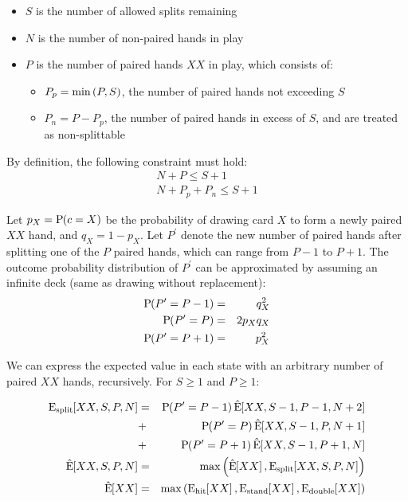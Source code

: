 \begin{itemize}
\item $S$ is the number of allowed splits remaining
\item $N$ is the number of non-paired hands in play
\item $P$ is the number of paired hands $XX$ in play, which consists of:
\begin{itemize}
\item $P_p=\textrm{min}\left(P,S\right)$, the number of paired hands not exceeding $S$
\item $P_n=P-P_p$, the number of paired hands in excess of $S$, 
	and are treated as non-splittable
\end{itemize}
\end{itemize}

By definition, the following constraint must hold:
\begin{eqnarray}
N+P \le S+1 \nonumber \\
N+P_p+P_n \le S+1
\end{eqnarray}

\noindent
Let $p_X=\textrm{P}\hspace{-.5ex}\left(c=X\right)$ be the probability of drawing card $X$ to form a 
newly paired $XX$ hand, and $q_X=1-p_X$.
Let $P^\prime$ denote the new number of paired hands after 
splitting one of the $P$ paired hands, which can range from $P-1$ to $P+1$.
The outcome probability distribution of $P^\prime$ can be approximated 
by assuming an infinite deck (same as drawing without replacement):
\begin{eqnarray}
\textrm{P}\hspace{-.5ex}\left(P^\prime=P-1\right) &=& q_X^2 \\
\textrm{P}\hspace{-.5ex}\left(P^\prime=P\right) &=& 2 p_X q_X \\
\textrm{P}\hspace{-.5ex}\left(P^\prime=P+1\right) &=& p_X^2
\end{eqnarray}

\noindent
We can express the expected value in each state
with an arbitrary number of paired $XX$ hands, recursively.
For $S \ge 1$ and $P \ge 1$:

\begin{eqnarray}
\ExpAct{split}{XX,S,P,N} &=& \Prob{P^\prime=P-1}\ExpOpt{XX,S-1,P-1,N+2} \nonumber \\
&+& \Prob{P^\prime=P}\ExpOpt{XX,S-1,P,N+1} \nonumber \\
&+& \Prob{P^\prime=P+1}\ExpOpt{XX,S-1,P+1,N} \label{eqn:split:EV:recursion} \\
\ExpOpt{XX,S,P,N} &=& \Max{\ExpOpt{XX},\ExpAct{split}{XX,S,P,N}} \\
\ExpOpt{XX} &=& \Max{\ExpAct{hit}{XX},\ExpAct{stand}{XX},\ExpAct{double}{XX}}
\end{eqnarray}

